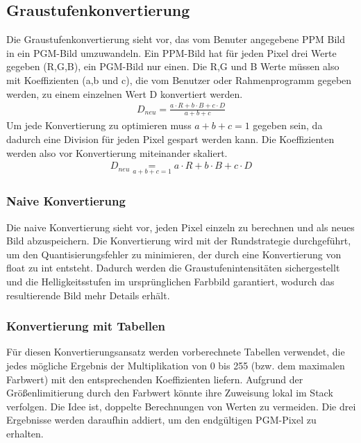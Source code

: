\documentclass[course=erap]{aspdoc}
\begin{document}
\subsection{Graustufenkonvertierung}
Die Graustufenkonvertierung sieht vor, das vom Benuter angegebene PPM Bild in ein PGM-Bild umzuwandeln. Ein PPM-Bild hat für jeden Pixel drei Werte gegeben (R,G,B), ein PGM-Bild nur einen. Die R,G und B Werte müssen also mit Koeffizienten (a,b und c), die vom Benutzer oder Rahmenprogramm gegeben werden, zu einem einzelnen Wert D konvertiert werden.
 \begin{align}
    D_{neu} {=} \frac{a \cdot R + b \cdot B + c \cdot D}{a + b + c}
\end{align}
Um jede Konvertierung zu optimieren muss $a + b + c = 1$ gegeben sein, da dadurch eine Division für jeden Pixel gespart werden kann. Die Koeffizienten werden also vor Konvertierung miteinander skaliert.
 \begin{align}
    D_{neu} \underset{a + b + c = 1}{=} a \cdot R + b \cdot B + c \cdot D
\end{align}


\subsubsection{Naive Konvertierung}
Die naive Konvertierung sieht vor, jeden Pixel einzeln zu berechnen und als neues Bild abzuspeichern. Die Konvertierung wird mit der Rundstrategie durchgeführt, um den Quantisierungsfehler zu minimieren, der durch eine Konvertierung von float zu int entsteht. Dadurch werden die Graustufenintensitäten sichergestellt und die Helligkeitsstufen im ursprünglichen Farbbild garantiert, wodurch das resultierende Bild mehr Details erhält.

\subsubsection{Konvertierung mit Tabellen}
Für diesen Konvertierungsansatz werden vorberechnete Tabellen verwendet, die jedes mögliche Ergebnis der Multiplikation von 0 bis 255 (bzw. dem maximalen Farbwert) mit den entsprechenden Koeffizienten liefern. Aufgrund der Größenlimitierung durch den Farbwert könnte ihre Zuweisung lokal im Stack verfolgen. Die Idee ist, doppelte Berechnungen von Werten zu vermeiden. Die drei Ergebnisse werden daraufhin addiert, um den endgültigen PGM-Pixel zu erhalten.
\end{document}
